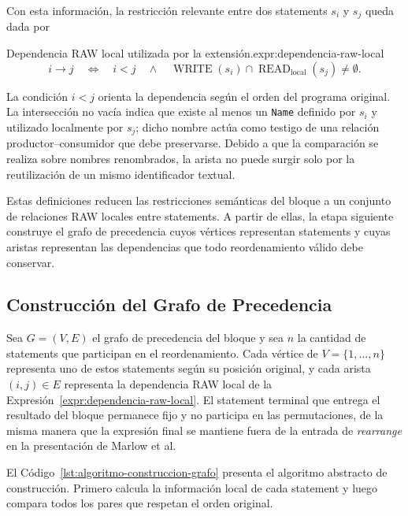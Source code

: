 Con esta información, la restricción relevante entre dos statements $s_i$ y $s_j$ queda dada por

\begin{ReportExpression}{Dependencia RAW local utilizada por la extensión.}{expr:dependencia-raw-local}
\[
i\longrightarrow j
\quad\iff\quad
i<j
\quad\land\quad
\operatorname{WRITE}(s_i)
\cap
\operatorname{READ}_{\mathrm{local}}(s_j)
\neq\emptyset.
\]
\end{ReportExpression}

La condición $i<j$ orienta la dependencia según el orden del programa original. La intersección no vacía indica que existe al menos un \texttt{Name} definido por $s_i$ y utilizado localmente por $s_j$; dicho nombre actúa como testigo de una relación productor--consumidor que debe preservarse. Debido a que la comparación se realiza sobre nombres renombrados, la arista no puede surgir solo por la reutilización de un mismo identificador textual.

Estas definiciones reducen las restricciones semánticas del bloque a un conjunto de relaciones RAW locales entre statements. A partir de ellas, la etapa siguiente construye el grafo de precedencia cuyos vértices representan statements y cuyas aristas representan las dependencias que todo reordenamiento válido debe conservar.

\subsection{Construcción del Grafo de Precedencia}
\label{sec:solucion-construccion-grafo}

Sea $G=(V,E)$ el grafo de precedencia del bloque y sea $n$ la cantidad de statements que participan en el reordenamiento. Cada vértice de $V=\{1,\ldots,n\}$ representa uno de estos statements según su posición original, y cada arista $(i,j)\in E$ representa la dependencia RAW local de la Expresión~\ref{expr:dependencia-raw-local}. El statement terminal que entrega el resultado del bloque permanece fijo y no participa en las permutaciones, de la misma manera que la expresión final se mantiene fuera de la entrada de \textit{rearrange} en la presentación de Marlow et al.

El Código~\ref{lst:algoritmo-construccion-grafo} presenta el algoritmo abstracto de construcción. Primero calcula la información local de cada statement y luego compara todos los pares que respetan el orden original.

